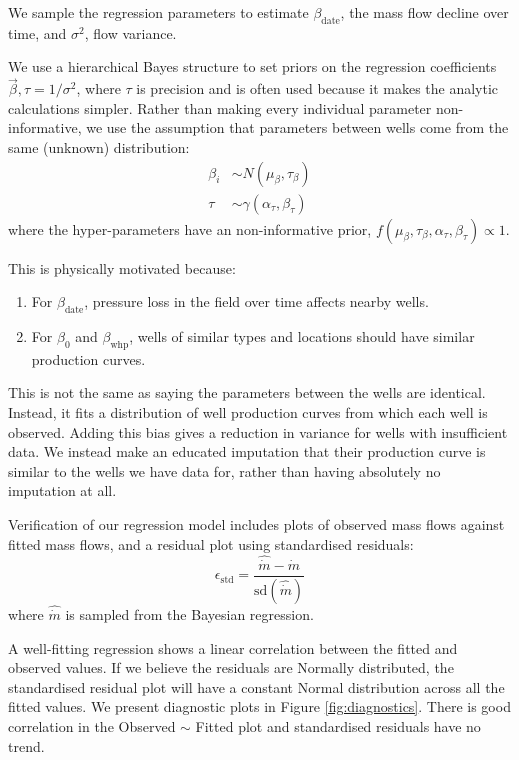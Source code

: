 \documentclass[a4paper, 12pt]{article}
\begin{document}
We sample the regression parameters to estimate $\beta_\text{date}$, the mass flow decline over time, and $\sigma^2$, flow variance.

We use a hierarchical Bayes structure to set priors on the regression coefficients $\vec{\beta},\tau=1/\sigma^2$, where $\tau$ is precision and is often used because it makes the analytic calculations simpler. Rather than making every individual parameter non-informative, we use the assumption that parameters between wells come from the same (unknown) distribution:
\begin{align}
\beta_i &\sim N\left( \mu_\beta,\tau_\beta \right)\\
\tau &\sim \gamma\left(\alpha_\tau,\beta_\tau\right)
\end{align}
where the hyper-parameters have an non-informative prior, $f\left(\mu_\beta,\tau_\beta,\alpha_\tau,\beta_\tau\right) \propto 1$.
 
This is physically motivated because:
\begin{enumerate}
\item For $\beta_\text{date}$, pressure loss in the field over time affects nearby wells.
\item For $\beta_0$ and $\beta_\text{whp}$, wells of similar types and locations should have similar production curves.
\end{enumerate}
This is not the same as saying the parameters between the wells are identical. Instead, it fits a distribution of well production curves from which each well is observed. Adding this bias gives a reduction in variance for wells with insufficient data. We instead make an educated imputation that their production curve is similar to the wells we have data for, rather than having absolutely no imputation at all.

Verification of our regression model includes plots of observed mass flows against fitted mass flows, and a residual plot using standardised residuals:
\begin{equation}
\epsilon_\text{std} = \frac{\hat{\dot{m}} - \dot{m}}{\text{sd}\left( \hat{\dot{m}} \right)}
\end{equation}
where $\hat{\dot{m}}$ is sampled from the Bayesian regression.

A well-fitting regression shows a linear correlation between the fitted and observed values. If we believe the residuals are Normally distributed, the standardised residual plot will have a constant Normal distribution across all the fitted values. We present diagnostic plots in Figure \ref{fig:diagnostics}. There is good correlation in the Observed $\sim$ Fitted plot and standardised residuals have no trend. %
\end{document}

